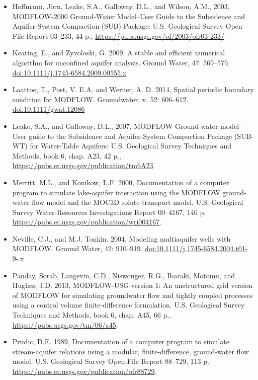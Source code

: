 \documentclass[11pt,twoside,twocolumn]{usgsreport}
\begin{document}
\begin{itemize}
\item Hoffmann, J{\"o}rn, Leake, S.A., Galloway, D.L., and Wilson, A.M., 2003, MODFLOW-2000 Ground-Water Model--User Guide to the Subsidence and Aquifer-System Compaction (SUB) Package: U.S. Geological Survey Open-File Report 03–233, 44 p.,  \url{https://pubs.usgs.gov/of/2003/ofr03-233/}

\item Keating, E., and Zyvoloski, G. 2009. A stable and efficient numerical algorithm for unconfined aquifer analysis. Ground Water, 47: 569--579. \href{https://doi.org/10.1111/j.1745-6584.2009.00555.x}{doi:10.1111/j.1745-6584.2009.00555.x}

\item Laattoe, T., Post, V. E.A. and Werner, A. D. 2014, Spatial periodic boundary condition for MODFLOW. Groundwater, v. 52: 606--612. \href{https://doi.org/10.1111/gwat.12086}{doi:10.1111/gwat.12086}

\item Leake, S.A., and Galloway, D.L., 2007, MODFLOW Ground-water model--User guide to the Subsidence and Aquifer-System Compaction Package (SUB-WT) for Water-Table Aquifers: U.S. Geological Survey Techniques and Methods, book 6, chap. A23, 42 p., \url{https://pubs.er.usgs.gov/publication/tm6A23}.

\item Merritt, M.L., and Konikow, L.F. 2000, Documentation of a computer program to simulate lake-aquifer interaction using the MODFLOW ground-water flow model and the MOC3D solute-transport model. U.S. Geological Survey Water-Resources Investigations Report 00--4167, 146 p. \url{https://pubs.er.usgs.gov/publication/wri004167}.

\item Neville, C.J., and M.J. Tonkin. 2004. Modeling multiaquifer wells with MODFLOW.  Ground Water, 42: 910--919. \href{https://doi.org/10.1111/j.1745-6584.2004.t01-9-.x}{doi:10.1111/j.1745-6584.2004.t01-9-.x}

\item Panday, Sorab, Langevin, C.D., Niswonger, R.G., Ibaraki, Motomu, and Hughes, J.D. 2013, MODFLOW-USG version 1: An unstructured grid version of MODFLOW for simulating groundwater flow and tightly coupled processes using a control volume finite-difference formulation. U.S. Geological Survey Techniques and Methods, book 6, chap. A45, 66 p., \url{https://pubs.usgs.gov/tm/06/a45}.

\item Prudic, D.E. 1989, Documentation of a computer program to simulate stream-aquifer relations using a modular, finite-difference, ground-water flow model. U.S. Geological Survey Open-File Report 88--729, 113 p. \url{https://pubs.er.usgs.gov/publication/ofr88729}.


\end{itemize}
\end{document}
